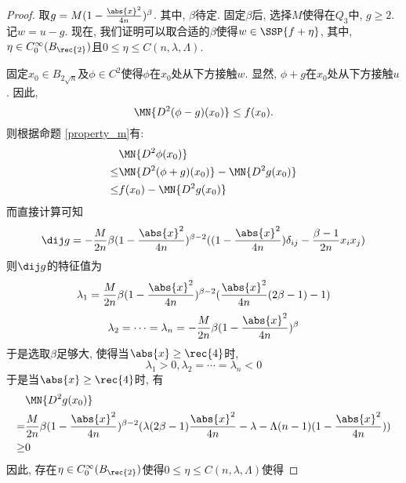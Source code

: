\begin{proof}
    取$g=M(1-\frac{\abs{x}^2}{4n})^\beta$.  其中, $\beta$待定.  固定$\beta$后, 选择$M$使得在$Q_3$中, $g \ge 2$.  记$w=u-g$.  现在, 我们证明可以取合适的$\beta$使得$w \in \SSP{f+\eta}$, 其中, $\eta \in C^\infty_0(B_{\rec{2}})$且$0 \le \eta \le C(n, \lambda, \Lambda)$.  \par
    固定$x_0 \in B_{2\sqrt{n}}$及$\phi \in C^2$使得$\phi$在$x_0$处从下方接触$w$.  显然, $\phi+g$在$x_0$处从下方接触$u$.  因此, $$\MN{D^2(\phi-g)(x_0)} \le f(x_0).  $$  则根据命题 \eqref{property_m}有:
    \begin{equation}
        \begin{split}
            &\MN{D^2\phi(x_0)} \\
            \le & \MN{D^2(\phi+g)(x_0)}-\MN{D^2g(x_0)}\\
            \le & f(x_0) - \MN{D^2g(x_0)}
        \end{split}
    \end{equation}
    而直接计算可知
    \begin{equation}
        \dij g=-\frac{M}{2n}\beta(1-\frac{\abs{x}^2}{4n})^{\beta-2}((1-\frac{\abs{x}^2}{4n})\delta_{ij}-\frac{\beta-1}{2n}x_ix_j)
    \end{equation}
    则$\dij g$的特征值为
    \begin{equation}
        \lambda_1=\frac{M}{2n}\beta(1-\frac{\abs{x}^2}{4n})^{\beta-2}(\frac{\abs{x}^2}{4n}(2\beta-1)-1)
    \end{equation}
    \begin{equation}
        \lambda_2=\cdots=\lambda_n=-\frac{M}{2n}\beta(1-\frac{\abs{x}^2}{4n})^\beta
    \end{equation}
    于是选取$\beta$足够大, 使得当$\abs{x} \ge \rec{4}$时, 
    \begin{equation}
        \lambda_1 >0, \lambda_2=\cdots=\lambda_n <0
    \end{equation}
    于是当$\abs{x} \ge \rec{4}$时, 有
    \begin{equation}
        \begin{split}
            &\MN{D^2g(x_0)} \\
            =& \frac{M}{2n}\beta(1-\frac{\abs{x}^2}{4n})^{\beta-2}(\lambda(2\beta-1)\frac{\abs{x}^2}{4n}-\lambda-\Lambda(n-1)(1-\frac{\abs{x}^2}{4n}))\\
            \ge & 0
        \end{split}
    \end{equation}
    因此, 存在$\eta \in C^\infty_0(B_\rec{2})$使得$0 \le \eta \le C(n, \lambda, \Lambda)$使得

\end{proof}

